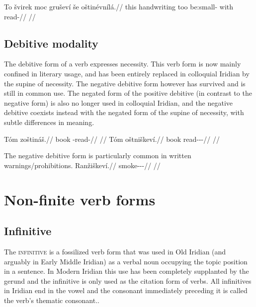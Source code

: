 \pex
\begingl
\gla To švirek moc gruševí še oštinévnílá.//
\glb this handwriting too be:small- with read-//
\glft {}//
\endgl
\xe

\subsection{Debitive modality}

The debitive form of a verb expresses necessity. This verb form is now mainly
confined in literary usage, and has been entirely replaced in colloquial Iridian
by the supine of necessity. The negative debitive form however has
survived and is still in common use. The negated form of the
positive debitive (in contrast to the negative form) is also no longer used in
colloquial Iridian, and the negative debitive coexists instead with the negated
form of the supine of necessity, with subtle differences in meaning.

\begin{multicols}{2}
  \pex
  \a
  \begingl
  \gla Tóm zoštináš.//
  \glb book \Neg{}-read-\SupN{}//
  \glft {}//
  \endgl
  \a \begingl
  \gla Tóm oštniškeví.//
  \glb book read-\Pv{}-\N{}\Deb{}-\Cont{}//
  \glft {}//
  \endgl
  \xe
\end{multicols}

The negative debitive form is particularly common in written warnings/prohibitions.
\pex \begingl
  \gla Ranžiškeví.//
  \glb smoke-\Av{}-\N{}\Deb{}-\Cont{}//
  \glft {}//
  \endgl
\xe


\section{Non-finite verb forms}

\subsection{Infinitive}\label{sec:infinitive}

The {\scshape infinitive} is a fossilized verb form that was used in Old
Iridian (and arguably in Early Middle Iridian) as a verbal noun occupying the topic position in a
sentence. In Modern Iridian this use has been completely supplanted by the
gerund and the infinitive is only used as the citation
form of verbs. All infinitives in Iridian end in the vowel
 and the consonant immediately preceding it is called the verb's
thematic consonant..

